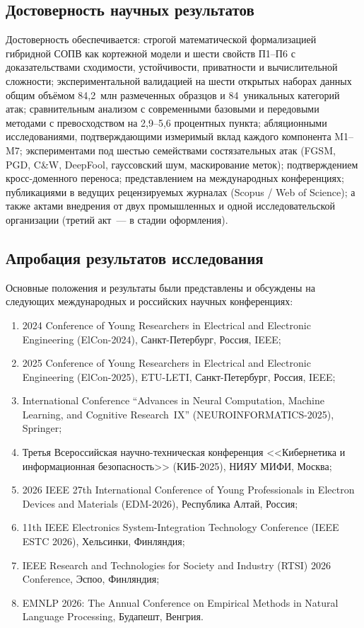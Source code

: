 \documentclass[12pt,a5paper]{article}
\begin{document}
\subsection*{Достоверность научных результатов}

Достоверность обеспечивается: строгой математической
формализацией гибридной СОПВ как кортежной модели и шести
свойств П1--П6 с доказательствами сходимости, устойчивости,
приватности и вычислительной сложности; экспериментальной
валидацией на шести открытых наборах данных общим объёмом
84,2~млн размеченных образцов и 84~уникальных категорий
атак; сравнительным анализом с современными базовыми и
передовыми методами с превосходством на 2,9--5,6 процентных
пункта; абляционными исследованиями, подтверждающими
измеримый вклад каждого компонента M1--M7; экспериментами
под шестью семействами состязательных атак (FGSM, PGD, C\&W,
DeepFool, гауссовский шум, маскирование меток); подтверждением
кросс-доменного переноса; представлением на международных
конференциях; публикациями в ведущих рецензируемых журналах
(Scopus / Web of Science); а также актами внедрения от двух
промышленных и одной исследовательской организации (третий
акт~--- в стадии оформления).

\subsection*{Апробация результатов исследования}

Основные положения и результаты были представлены и
обсуждены на следующих международных и российских научных
конференциях:

\begin{enumerate}
\item 2024 Conference of Young Researchers in Electrical and
Electronic Engineering (ElCon-2024), Санкт-Петербург, Россия, IEEE;
\item 2025 Conference of Young Researchers in Electrical and
Electronic Engineering (ElCon-2025), ETU-LETI, Санкт-Петербург,
Россия, IEEE;
\item International Conference ``Advances in Neural Computation,
Machine Learning, and Cognitive Research~IX''
(NEUROINFORMATICS-2025), Springer;
\item Третья Всероссийская научно-техническая конференция
<<Кибернетика и информационная безопасность>> (КИБ-2025),
НИЯУ МИФИ, Москва;
\item 2026 IEEE 27th International Conference of Young
Professionals in Electron Devices and Materials (EDM-2026),
Республика Алтай, Россия;
\item 11th IEEE Electronics System-Integration Technology
Conference (IEEE ESTC 2026), Хельсинки, Финляндия;
\item IEEE Research and Technologies for Society and Industry
(RTSI) 2026 Conference, Эспоо, Финляндия;
\item EMNLP 2026: The Annual Conference on Empirical Methods in
Natural Language Processing, Будапешт, Венгрия.
\end{enumerate}
\end{document}
